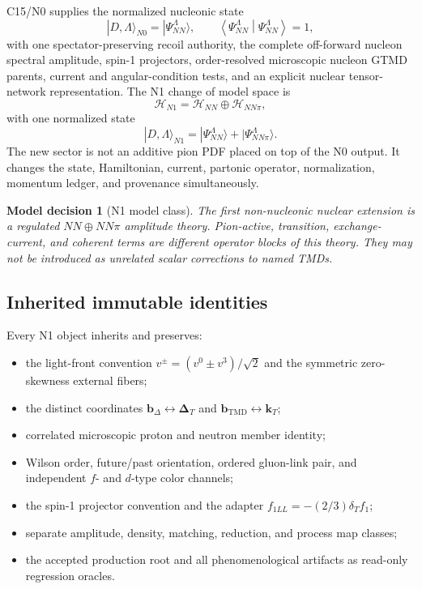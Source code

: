\documentclass[11pt]{article}
\newtheorem{decision}[definition]{Model decision}
\newcommand{\kT}{\bm{k}_{T}}
\newcommand{\DT}{\bm{\Delta}_{T}}
\newcommand{\bD}{\bm{b}_{\Delta}}
\newcommand{\bM}{\bm{b}_{\mathrm{TMD}}}
\newcommand{\Hil}{\mathcal H}
\newcommand{\inner}[2]{\left\langle #1\middle|#2\right\rangle}
\newcommand{\HNN}{\Hil_{NN}}
\newcommand{\HNNpi}{\Hil_{NN\pi}}
\begin{document}
C15/N0 supplies the normalized nucleonic state
\begin{equation}
 |D,\Lambda\rangle_{N0}=|\Psi_{NN}^{\Lambda}\rangle,
 \qquad
 \inner{\Psi_{NN}^{\Lambda}}{\Psi_{NN}^{\Lambda}}=1,
 \label{eq:n0-state}
\end{equation}
with one spectator-preserving recoil authority, the complete off-forward
nucleon spectral amplitude, spin-1 projectors, order-resolved microscopic
nucleon GTMD parents, current and angular-condition tests, and an explicit
nuclear tensor-network representation.  The N1 change of model space is
\begin{equation}
 \Hil_{N1}=\HNN\oplus\HNNpi,
 \label{eq:n1-space}
\end{equation}
with one normalized state
\begin{equation}
 |D,\Lambda\rangle_{N1}
 =|\Psi_{NN}^{\Lambda}\rangle
 +|\Psi_{NN\pi}^{\Lambda}\rangle .
 \label{eq:n1-state}
\end{equation}
The new sector is not an additive pion PDF placed on top of the N0 output.  It
changes the state, Hamiltonian, current, partonic operator, normalization,
momentum ledger, and provenance simultaneously.

\begin{decision}[N1 model class]
The first non-nucleonic nuclear extension is a regulated
\(NN\oplus NN\pi\) amplitude theory.  Pion-active, transition, exchange-current,
and coherent terms are different operator blocks of this theory.  They may not
be introduced as unrelated scalar corrections to named TMDs.
\end{decision}

\subsection{Inherited immutable identities}

Every N1 object inherits and preserves:
\begin{itemize}
\item the light-front convention
\(
 v^{\pm}=(v^0\pm v^3)/\sqrt2
\)
and the symmetric zero-skewness external fibers;
\item the distinct coordinates \(\bD\leftrightarrow\DT\) and
\(\bM\leftrightarrow\kT\);
\item correlated microscopic proton and neutron member identity;
\item Wilson order, future/past orientation, ordered gluon-link pair, and
independent \(f\)- and \(d\)-type color channels;
\item the spin-1 projector convention and the adapter
\(
 f_{1LL}=-(2/3)\delta_Tf_1
\);
\item separate amplitude, density, matching, reduction, and process map
classes;
\item the accepted production root and all phenomenological artifacts as
read-only regression oracles.
\end{itemize}
\end{document}
